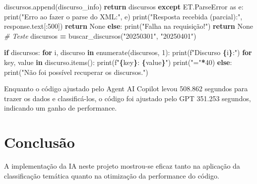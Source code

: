 \documentclass[
]{article}
\newenvironment{Shaded}{\begin{snugshade}}{\end{snugshade}}
\newcommand{\BuiltInTok}[1]{#1}
\newcommand{\CommentTok}[1]{\textcolor[rgb]{0.56,0.35,0.01}{\textit{#1}}}
\newcommand{\ControlFlowTok}[1]{\textcolor[rgb]{0.13,0.29,0.53}{\textbf{#1}}}
\newcommand{\DecValTok}[1]{\textcolor[rgb]{0.00,0.00,0.81}{#1}}
\newcommand{\ImportTok}[1]{#1}
\newcommand{\KeywordTok}[1]{\textcolor[rgb]{0.13,0.29,0.53}{\textbf{#1}}}
\newcommand{\NormalTok}[1]{#1}
\newcommand{\OperatorTok}[1]{\textcolor[rgb]{0.81,0.36,0.00}{\textbf{#1}}}
\newcommand{\SpecialCharTok}[1]{\textcolor[rgb]{0.81,0.36,0.00}{\textbf{#1}}}
\newcommand{\SpecialStringTok}[1]{\textcolor[rgb]{0.31,0.60,0.02}{#1}}
\newcommand{\StringTok}[1]{\textcolor[rgb]{0.31,0.60,0.02}{#1}}
\newcommand{\VariableTok}[1]{\textcolor[rgb]{0.00,0.00,0.00}{#1}}
\begin{document}
\begin{Shaded}
\begin{Highlighting}[]
\NormalTok{                discursos.append(discurso\_info)}
            \ControlFlowTok{return}\NormalTok{ discursos}
        \ControlFlowTok{except}\NormalTok{ ET.ParseError }\ImportTok{as}\NormalTok{ e:}
            \BuiltInTok{print}\NormalTok{(}\StringTok{"Erro ao fazer o parse do XML:"}\NormalTok{, e)}
            \BuiltInTok{print}\NormalTok{(}\StringTok{"Resposta recebida (parcial):"}\NormalTok{, response.text[:}\DecValTok{500}\NormalTok{])}
            \ControlFlowTok{return} \VariableTok{None}
    \ControlFlowTok{else}\NormalTok{:}
        \BuiltInTok{print}\NormalTok{(}\StringTok{"Falha na requisição!"}\NormalTok{)}
        \ControlFlowTok{return} \VariableTok{None}
\CommentTok{\# Teste}
\NormalTok{discursos }\OperatorTok{=}\NormalTok{ buscar\_discursos(}\StringTok{"20250301"}\NormalTok{, }\StringTok{"20250401"}\NormalTok{)}

\ControlFlowTok{if}\NormalTok{ discursos:}
    \ControlFlowTok{for}\NormalTok{ i, discurso }\KeywordTok{in} \BuiltInTok{enumerate}\NormalTok{(discursos, }\DecValTok{1}\NormalTok{):}
        \BuiltInTok{print}\NormalTok{(}\SpecialStringTok{f"Discurso }\SpecialCharTok{\{}\NormalTok{i}\SpecialCharTok{\}}\SpecialStringTok{:"}\NormalTok{)}
        \ControlFlowTok{for}\NormalTok{ key, value }\KeywordTok{in}\NormalTok{ discurso.items():}
            \BuiltInTok{print}\NormalTok{(}\SpecialStringTok{f"}\SpecialCharTok{\{}\NormalTok{key}\SpecialCharTok{\}}\SpecialStringTok{: }\SpecialCharTok{\{}\NormalTok{value}\SpecialCharTok{\}}\SpecialStringTok{"}\NormalTok{)}
        \BuiltInTok{print}\NormalTok{(}\StringTok{"="}\OperatorTok{*}\DecValTok{40}\NormalTok{)}
\ControlFlowTok{else}\NormalTok{:}
    \BuiltInTok{print}\NormalTok{(}\StringTok{"Não foi possível recuperar os discursos."}\NormalTok{)}
\end{Highlighting}
\end{Shaded}

Enquanto o código ajustado pelo Agent AI Copilot levou 508.862 segundos
para trazer os dados e classificá-los, o código foi ajustado pelo GPT
351.253 segundos, indicando um ganho de performance.

\section{Conclusão}\label{conclusuxe3o}

A implementação da IA neste projeto mostrou-se eficaz tanto na aplicação
da classificação temática quanto na otimização da performance do código.
\end{document}
